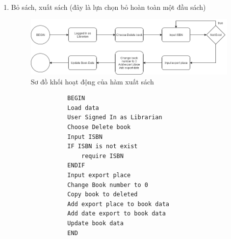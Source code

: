 \documentclass[12pt,a4paper]{report}
\begin{document}
\begin{enumerate}
\begin{verbatim}
            \end{verbatim}
              \item Bỏ sách, xuất sách
              (đây là lựa chọn bỏ hoàn toàn một đầu sách)
            \begin{figure}[H]
                \centering
                \label{F:movebook}
                \includegraphics[scale = .5]{movebook.png}
                \caption{Sơ đồ khối hoạt động của hàm xuất sách}
            \end{figure}
                \begin{verbatim}
                BEGIN
                Load data
                User Signed In as Librarian
                Choose Delete book
                Input ISBN
                IF ISBN is not exist
                    require ISBN
                ENDIF
                Input export place
                Change Book number to 0
                Copy book to deleted
                Add export place to book data
                Add date export to book data
                Update book data
                END
                \end{verbatim}
            \end{enumerate}
\end{document}
